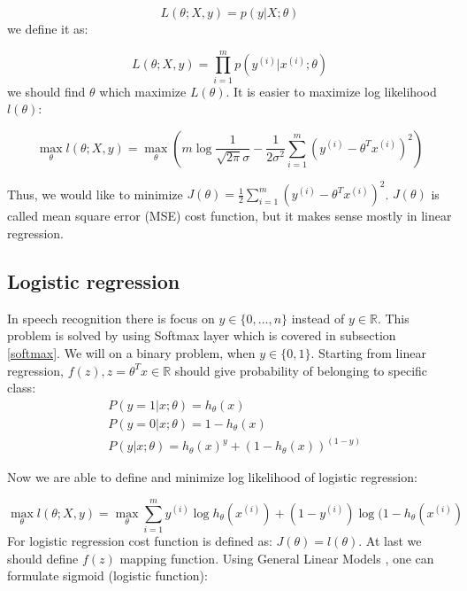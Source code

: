 \begin{equation}
	L(\theta;X,y) = p(y|X;\theta)
\end{equation}
we define it as:

\begin{equation}
	L(\theta;X,y) = \prod\limits_{i=1}^m p(y^{(i)}|x^{(i)};\theta)
\end{equation}
we should find $\theta$ which maximize $L(\theta)$. It is easier to maximize log likelihood~$l(\theta)$:

\begin{equation}
	\max\limits_{\theta}  l(\theta;X,y) =  \max\limits_\theta \left( m\log{\frac{1}{\sqrt{2\pi}\sigma}} - \frac{1}{2\sigma^2}\sum\limits^{m}_{i=1}(y^{(i)}-\theta^Tx^{(i)})^2 \right)
\end{equation}

Thus, we would like to minimize $J(\theta)=\frac{1}{2}\sum\limits^{m}_{i=1}(y^{(i)}-\theta^Tx^{(i)})^2$. $J(\theta)$ is called mean square error (MSE) cost function, but it makes sense mostly in linear regression.

\subsection{Logistic regression}

In speech recognition there is focus on $y \in \{0,\ldots,n\}$ instead of $y \in \mathbb{R}$. This problem is solved by using Softmax layer which is covered in subsection \ref{softmax}. We will on a binary problem, when $y \in \{0,1\} $. Starting from linear regression, $f(z), z = \theta^Tx \in \mathbb{R}$ should give probability of belonging to specific class:
\begin{align}
	& P(y=1|x;\theta) = h_\theta(x) \\
	& P(y=0|x;\theta) = 1-h_\theta(x) \\
	& P(y|x;\theta) =  h_\theta(x)^y + (1-h_\theta(x))^{(1-y)}
\end{align}

Now we are able to define and minimize log likelihood of logistic regression:  

\begin{equation} 
	\max\limits_\theta l(\theta;X,y) = \max\limits_\theta \sum\limits^{m}_{i=1}y^{(i)}\log{h_\theta(x^{(i)})}+(1-y^{(i)})\log(1-h_\theta(x^{(i)})
\end{equation}
For logistic regression cost function is defined as: $J(\theta)=l(\theta)$. At last we should define $f(z)$ mapping function. Using General Linear Models \parencite[p. 26]{ng_cs229_2000}, one  can formulate sigmoid (logistic function):


